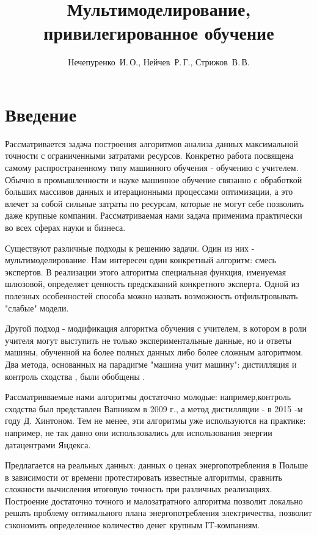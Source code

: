 \documentclass[12pt,twoside]{article}
\title
    [Образец оформления статьи для публикации] %
    {Мультимоделирование, привилегированное обучение}
\author
    [Нечепуренко~И.\,О.] %
    {Нечепуренко~И.\,О., Нейчев~Р.\,Г., Стрижов~В.\,В.} %
    [Нечепуренко~И.\,О.$^1$, Нейчев~Р.\,Г.$^2$, Стрижов~В.\,В.$^2$] %
\begin{document}
\maketitle
\section{Введение}

Рассматривается задача построения алгоритмов анализа данных максимальной точности с ограниченными затратами ресурсов. Конкретно работа посвящена самому распространенному типу машинного обучения - обучению с учителем. Обычно в промышленности и науке машинное обучение связанно с обработкой больших массивов данных и итерационными процессами оптимизации, а это влечет за собой сильные затраты по ресурсам, которые не могут себе позволить даже крупные компании. Рассматриваемая нами задача применима практически во всех сферах науки и бизнеса.

Существуют различные подходы к решению задачи. Один из них - мультимоделирование. Нам интересен один конкретный \cite{a}  алгоритм: смесь экспертов. В реализации этого алгоритма специальная функция, именуемая шлюзовой, определяет ценность предсказаний конкретного эксперта. Одной из полезных особенностей способа можно назвать возможность отфильтровывать "слабые" модели. 

Другой подход - модификация алгоритма обучения с учителем, в котором в роли учителя могут выступить не только экспериментальные данные, но и ответы машины, обученной на более полных данных либо более сложным алгоритмом.
Два метода, основанных на парадигме "машина учит машину":  дистилляция \cite{b}  и контроль сходства \cite{c} , были обобщены \cite{d} .

Рассматривваемые нами алгоритмы достаточно молодые: например,контроль сходства был представлен Вапником в 2009 г., а метод дистилляции - в 2015 -м году Д. Хинтоном.  Тем не менее, эти алгоритмы уже используются на практике: например, не так давно они использовались для использования энергии датацентрами Яндекса. 

Предлагается на реальных данных: данных о ценах энергопотребления в Польше в зависимости от времени протестировать известные алгоритмы, сравнить сложности вычисления итоговую точность при различных  реализациях. Построение достаточно точного и малозатратного алгоритма позволит локально решать проблему оптимального плана энергопотребления электричества, позволит сэкономить определенное количество денег крупным IT-компаниям.
\end{document}
